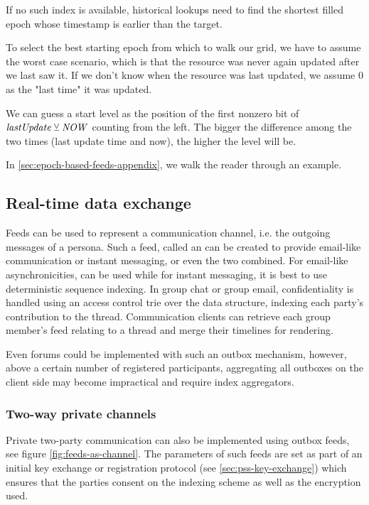 If no such index is available, historical lookups need to find the shortest filled epoch whose timestamp is earlier than the target. 

To select the best starting epoch from which to walk our grid, we have to assume the worst case scenario, which is that the resource was never again updated after we last saw it. If we don't know when the resource was last updated, we assume 0 as the "last time" it was updated.

We can guess a start level as the position of the first nonzero bit of $\mathit{lastUpdate}\veebar \mathit{NOW}$ counting from the left. The bigger the difference among the two times (last update time and now), the higher the level will be.

In \ref{sec:epoch-based-feeds-appendix}, we walk the reader through an example.

\subsection{Real-time data exchange \statusyellow}\label{sec:feed-as-channel}

Feeds can be used to represent a communication channel, i.e. the outgoing messages of a persona. Such a feed, called an  can be created to provide email-like communication or instant messaging, or even the two combined. For email-like asynchronicities,  can be used while for instant messaging, it is best to use deterministic sequence indexing. 
In group chat or group email, confidentiality is handled using an access control trie over the data structure, indexing each party's contribution to the thread. Communication clients can retrieve each group member's feed relating to a thread and merge their timelines for rendering. 

Even forums could be implemented with such an outbox mechanism, however, above a certain number of registered participants, aggregating all outboxes on the client side may become impractical and require index aggregators.

\subsubsection{Two-way private channels}
 
Private two-party communication can also be implemented using outbox feeds, see figure \ref{fig:feeds-as-channel}. The parameters of such feeds are set as part of an initial key exchange or registration protocol (see \ref{sec:pss-key-exchange}) which ensures that the parties consent on the indexing scheme as well as the encryption used. 


